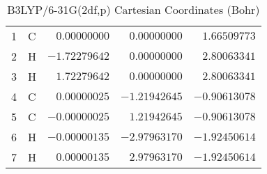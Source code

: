 \documentclass[10pt,oneside]{article}
\begin{document}
\begin{table}[h]
\centering
\caption{B3LYP/6-31G(2df,p) Cartesian Coordinates (Bohr)}
\begin{tabular}{llrrr}
\toprule
1  & C  & $ 0.00000000$ & $ 0.00000000$ & $ 1.66509773$ \\
2  & H  & $-1.72279642$ & $ 0.00000000$ & $ 2.80063341$ \\
3  & H  & $ 1.72279642$ & $ 0.00000000$ & $ 2.80063341$ \\
4  & C  & $ 0.00000025$ & $-1.21942645$ & $-0.90613078$ \\
5  & C  & $-0.00000025$ & $ 1.21942645$ & $-0.90613078$ \\
6  & H  & $-0.00000135$ & $-2.97963170$ & $-1.92450614$ \\
7  & H  & $ 0.00000135$ & $ 2.97963170$ & $-1.92450614$ \\
\bottomrule
\end{tabular}
\end{table}
\end{document}
